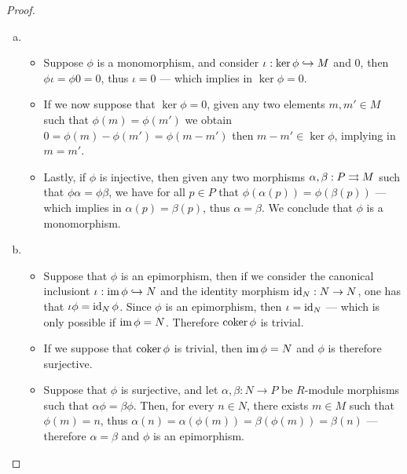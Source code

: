 \begin{proof}
    \begin{enumerate}[(a)]\setlength\itemsep{0em}
        \item
              \begin{itemize}\setlength\itemsep{0em}
                  \item Suppose \(\phi\) is a monomorphism, and consider
                        \(\iota: \ker \phi \hookrightarrow M\) and \(0\), then \(\phi \iota = \phi 0 = 0\), thus
                        \(\iota = 0\) --- which implies in \(\ker \phi = 0\).

                  \item If we now suppose that \(\ker \phi = 0\), given any two elements
                        \(m, m' \in M\) such that \(\phi(m) = \phi(m')\) we obtain
                        \(0 = \phi(m) - \phi(m') = \phi(m - m')\) then \(m - m' \in \ker \phi\),
                        implying in \(m = m'\).
                  \item Lastly, if \(\phi\) is injective, then given any two morphisms
                        \(\alpha, \beta: P \rightrightarrows M\) such that \(\phi \alpha = \phi \beta\), we have
                        for all \(p \in P\) that \(\phi(\alpha(p)) = \phi(\beta(p))\) --- which
                        implies in \(\alpha(p) = \beta(p)\), thus \(\alpha = \beta\). We conclude that
                        \(\phi\) is a monomorphism.
              \end{itemize}

        \item
              \begin{itemize}\setlength\itemsep{0em}
                  \item Suppose that \(\phi\) is an epimorphism, then if we consider the canonical
                        inclusiont \(\iota: \operatorname{im} \phi \hookrightarrow N\) and the identity morphism
                        \(\operatorname{id}_N: N \to N\), one has that \(\iota \phi = \operatorname{id}_N \phi\). Since \(\phi\)
                        is an epimorphism, then \(\iota = \operatorname{id}_N\) --- which is only possible if
                        \(\operatorname{im} \phi = N\). Therefore \(\operatorname{coker} \phi\) is trivial.

                  \item If we suppose that \(\operatorname{coker} \phi\) is trivial, then \(\operatorname{im} \phi = N\) and
                        \(\phi\) is therefore surjective.

                  \item Suppose that \(\phi\) is surjective, and let \(\alpha, \beta: N \to P\) be
                        \(R\)-module morphisms such that \(\alpha \phi = \beta \phi\). Then, for every
                        \(n \in N\), there exists \(m \in M\) such that \(\phi(m) = n\), thus
                        \(\alpha(n) = \alpha(\phi(m)) = \beta(\phi(m)) = \beta(n)\) --- therefore
                        \(\alpha = \beta\) and \(\phi\) is an epimorphism.
              \end{itemize}
    \end{enumerate}
\end{proof}

